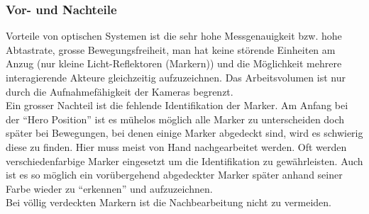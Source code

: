 \subsubsection{Vor- und Nachteile}

Vorteile von optischen Systemen ist die sehr hohe Messgenauigkeit bzw. hohe Abtastrate, grosse Bewegungsfreiheit, man hat keine störende Einheiten am Anzug (nur kleine Licht-Reflektoren (Markern)) und die Möglichkeit mehrere interagierende Akteure gleichzeitig aufzuzeichnen. Das Arbeitsvolumen ist nur durch die Aufnahmefähigkeit der Kameras begrenzt. \\
Ein grosser Nachteil ist die fehlende Identifikation der Marker. Am Anfang bei der ``Hero Position'' ist es mühelos möglich alle Marker zu unterscheiden doch später bei Bewegungen, bei denen einige Marker abgedeckt sind, wird es schwierig diese zu finden. Hier muss meist von Hand nachgearbeitet werden. Oft werden verschiedenfarbige Marker eingesetzt um die Identifikation zu gewährleisten. Auch ist es so möglich ein vorübergehend abgedeckter Marker später anhand seiner Farbe wieder zu ``erkennen'' und aufzuzeichnen. \\
Bei völlig verdeckten Markern ist die Nachbearbeitung nicht zu vermeiden. 
